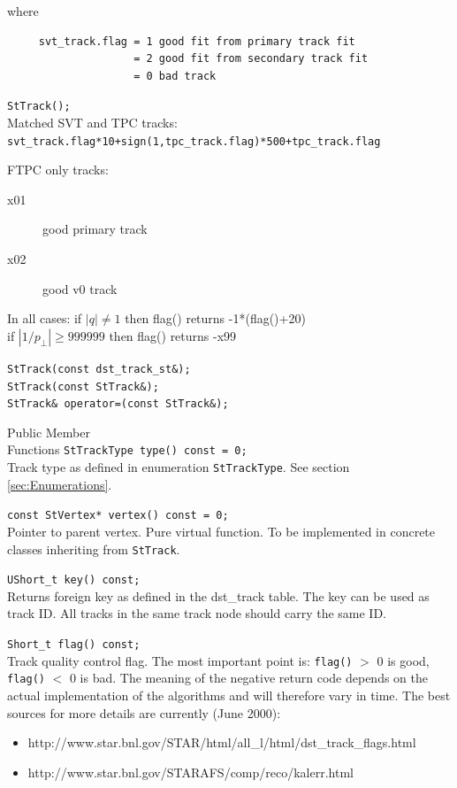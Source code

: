 \documentclass[twoside]{article}
\begin{document}
     where
     \begin{verbatim}
     svt_track.flag = 1 good fit from primary track fit 
                    = 2 good fit from secondary track fit 
                    = 0 bad track 
     \end{verbatim}
    \verb+StTrack();+\\
     Matched SVT and TPC tracks:\\ 
     \texttt{svt\_track.flag*10+sign(1,tpc\_track.flag)*500+tpc\_track.flag}

     FTPC only tracks:
     \begin{description}
     \item[x01] good primary track 
     \item[x02] good v0 track 
     \end{description} 
     
     In all cases: 
     if $|q| \ne 1$ then flag() returns -1*(flag()+20)\\ 
     if $|1/p_\perp| \ge 999999$ then flag() returns -x99 

    \verb+StTrack(const dst_track_st&);+\\
    \verb+StTrack(const StTrack&);+\\
    \verb+StTrack& operator=(const StTrack&);+\\
\item[Public Member\\ Functions]
    \verb+StTrackType type() const = 0;+\\
    Track type as defined in enumeration \texttt{StTrackType}.
    See section \ref{sec:Enumerations}.
    
    \verb+const StVertex* vertex() const = 0;+\\
    Pointer to parent vertex.
    Pure virtual function. To be implemented in
    concrete classes inheriting from \texttt{StTrack}.
    
    \verb+UShort_t key() const;+\\
    Returns foreign key as defined in the dst\_track table.
    The key can be used as track ID. All tracks in the same
    track node should carry the same ID. 
    
    \verb+Short_t flag() const;+\\
    Track quality control flag.   The most important
    point is: \texttt{flag()} $>$ 0 is good, \texttt{flag()} $<$ 0 is bad.  The meaning
    of the negative return code depends on the actual implementation
    of the algorithms and will therefore vary in time.  The best
    sources for more details are currently (June 2000):    
    \begin{itemize}
    \item http://www.star.bnl.gov/STAR/html/all\_l/html/dst\_track\_flags.html
    \item http://www.star.bnl.gov/STARAFS/comp/reco/kalerr.html
    \end{itemize} 
     
\end{document}
